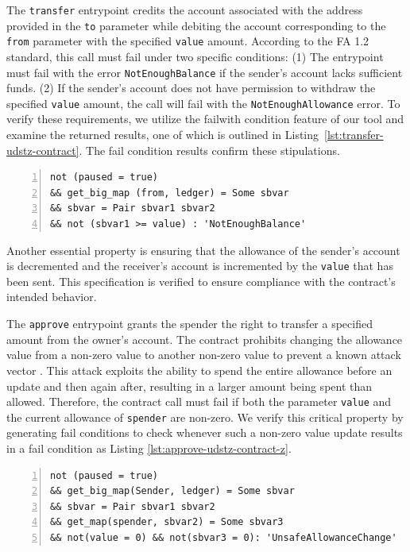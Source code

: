 \documentclass[runningheads]{llncs}
\begin{document}
The \lstinline/transfer/ entrypoint credits the account associated with the address provided in the \lstinline/to/ parameter while debiting the account corresponding to the \lstinline/from/ parameter with the specified \lstinline/value/ amount. According to the FA 1.2 standard, this call must fail under two specific conditions: (1) The entrypoint must fail with the error \lstinline/NotEnoughBalance/ if the sender's account lacks sufficient funds. (2) If the sender's account does not have permission to withdraw the specified \lstinline/value/ amount, the call will fail with the \lstinline/NotEnoughAllowance/ error. To verify these requirements, we utilize the failwith condition feature of our tool and examine the returned results, one of which is outlined in Listing~\ref{lst:transfer-udstz-contract}. The fail condition results confirm these stipulations.
\begin{lstlisting}[float,captionpos=b,caption={The \lstinline/NotEnoughBalance/ fail condition for the \lstinline/transfer/ entrypoint},label={lst:transfer-udstz-contract},numbers=left]
not (paused = true) 
&& get_big_map (from, ledger) = Some sbvar 
&& sbvar = Pair sbvar1 sbvar2 
&& not (sbvar1 >= value) : 'NotEnoughBalance'
\end{lstlisting}
Another essential property is ensuring that the allowance of the sender's account is decremented and the receiver's account is incremented by the \lstinline/value/ that has been sent. This specification is verified to ensure compliance with the contract's intended behavior.

The \texttt{approve} entrypoint grants the spender the right to transfer a specified amount from the owner's account. The contract prohibits changing the allowance value from a non-zero value to another non-zero value to prevent a known attack vector \cite{attack-vector}. This attack exploits the ability to spend the entire allowance before an update and then again after, resulting in a larger amount being spent than allowed. Therefore, the contract call must fail if both the parameter \lstinline/value/ and the current allowance of \lstinline/spender/ are non-zero. We verify this critical property by generating fail conditions to check whenever such a non-zero value update results in a fail condition as Listing \ref{lst:approve-udstz-contract-z}.
\begin{lstlisting}[float=tp,captionpos=b,caption={The non-zero value fail condition for the \lstinline/approve/ entrypoint},label={lst:approve-udstz-contract-z},numbers=left]
not (paused = true) 
&& get_big_map(Sender, ledger) = Some sbvar 
&& sbvar = Pair sbvar1 sbvar2 
&& get_map(spender, sbvar2) = Some sbvar3 
&& not(value = 0) && not(sbvar3 = 0): 'UnsafeAllowanceChange'
\end{lstlisting}
\end{document}
